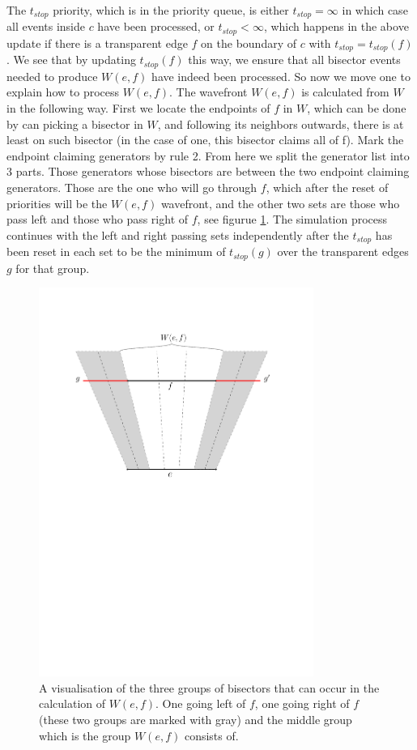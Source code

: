 The $t_{stop}$ priority, which is in the priority queue, is either $t_{stop} = \infty$ in which case all events inside $c$ have been 
processed, or $t_{stop} < \infty$, which happens in the above update if there is a transparent edge $f$ on the boundary of $c$ with 
$t_{stop} = t_{stop}(f)$. We see that by updating $t_{stop}(f)$ this way, we ensure that all bisector events needed to produce $W(e,f)$
have indeed been processed. So now we move one to explain how to process $W(e,f)$. The wavefront $W(e,f)$ is calculated from $W$ in the
following way. First we locate the endpoints of $f$ in $W$, which can be done by can picking a bisector in $W$, and following its 
neighbors outwards, there is at least on such bisector (in the case of one, this bisector claims all of f). Mark the endpoint claiming 
generators by rule 2. From here we split the generator list into 3 parts. Those generators whose bisectors are between the two endpoint
claiming generators. Those are the one who will go through $f$, which after the reset of priorities will be the $W(e,f)$ wavefront, and
the other two sets are those who pass left and those who pass right of $f$, see figurue \ref{fig:wef}. The simulation process continues
with the left and right passing sets independently after the $t_{stop}$ has been reset in each set to be the minimum of $t_{stop}(g)$ 
over the transparent edges $g$ for that group. 

\begin{figure}[H]
	\centering
	\includegraphics[width=0.8\textwidth]{figures/wef.pdf}
	\caption{A visualisation of the three groups of bisectors that can occur in the calculation of $W(e,f)$. One going left of $f$, one
	         going right of $f$ (these two groups are marked with gray) and the middle group which is the group $W(e,f)$ consists of.}
	\label{fig:wef}
\end{figure}

